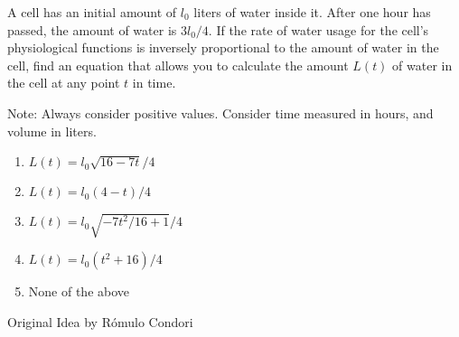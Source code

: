
A cell has an initial amount of $l_0$ liters of water inside it. After one hour has passed, the amount of water is $3 l_0 / 4$. If the rate of water usage for the cell's physiological functions is inversely proportional to the amount of water in the cell, find an equation that allows you to calculate the amount $L(t)$ of water in the cell at any point $t$ in time.

Note: Always consider positive values. Consider time measured in hours, and volume in liters.

\begin{enumerate}[label={\Alph*.}]
    \item $L(t) = l_0 \sqrt{16 - 7t} / 4$
    \item $L(t) = l_0 (4 - t) / 4$
    \item $L(t) = l_0 \sqrt{-7 t^2/16 + 1} / 4$
    \item $L(t) = l_0 (t^2 + 16) / 4$
    \item None of the above
\end{enumerate}

Original Idea by Rómulo Condori
